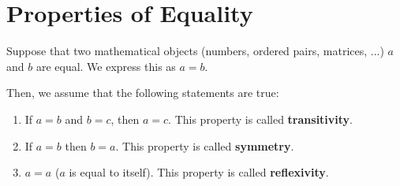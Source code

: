 \section{Properties of Equality}
Suppose that two mathematical objects (numbers, ordered pairs, matrices,
...) $a$ and $b$ are equal. We express this as $a = b$.

Then, we assume that the following statements are true:
\begin{enumerate}[label=(\alph*)]
  \item If $a = b$ and $b = c$, then $a = c$. This property is called
  \textbf{transitivity}.
  \item If $a = b$ then $b = a$. This property is called \textbf{symmetry}.
  \item $a = a$ ($a$ is equal to itself). This property is called
  \textbf{reflexivity}.
\end{enumerate}
